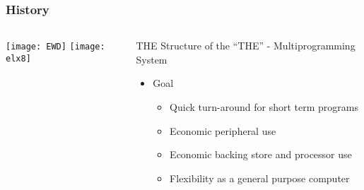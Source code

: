 %
%
%	
%	
%	
%		
%			
%			
%			
%		
%			
%
%					
%				
%			
%		
%		
%	
%	



\begin{frame}[plain]
	\frametitle{History}
	
	
	
	\begin{columns}
		
		\begin{column}{.4\textwidth}
			\centering
			\texttt{[image: EWD]}
			\texttt{[image: elx8]}
			
			
			
		\end{column}
		
		\begin{column}{.6\textwidth}
			
			THE Structure of the “THE” - Multiprogramming System
			\begin{itemize}
				\item Goal
				\begin{itemize}
					\item Quick turn-around for short term programs
					\item Economic peripheral use
					\item Economic backing store and processor use
					\item Flexibility as a general purpose computer
				\end{itemize}
				
			\end{itemize}	
			
		\end{column}
		
		
	\end{columns}
	
	
\end{frame}


